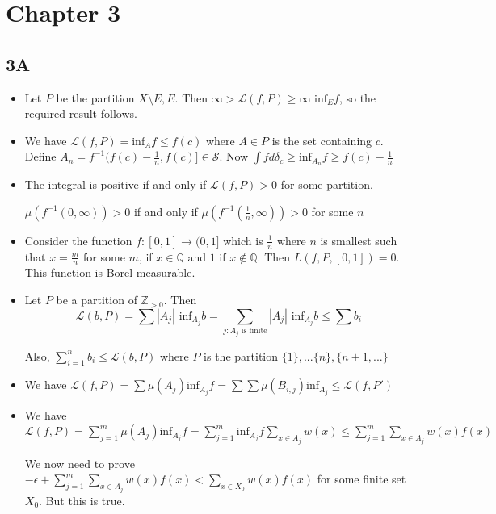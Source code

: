 \documentclass{article}
\begin{document}
\section*{Chapter 3}
\subsection*{3A}
\begin{itemize}
    \item [1] Let $P$ be the partition $X\setminus E,E$. Then $\infty>\mathcal{L}(f,P)\geq \infty \text{ inf}_Ef$, so the required result follows.
    \item[2] We have $\mathcal{L}(f,P)=\text{inf}_Af \leq f(c)$ where $A \in P$ is the set containing $c$. Define $A_n=f^{-1}(f(c)-\frac{1}{n},f(c)] \in \mathcal{S}$. Now $\int fd\delta_c\geq \text{inf}_{A_n}f\geq f(c)-\frac{1}{n}$

    \item[3] The integral is positive if and only if $\mathcal{L}(f,P)>0$ for some partition.

    $\mu(f^{-1}(0,\infty))>0$ if and only if $\mu(f^{-1}(\frac{1}{n},\infty))>0$ for some $n$

    \item[4] Consider the function $f:[0,1]\to(0,1]$ which is $\frac{1}{n}$ where $n$ is smallest such that $x=\frac{m}{n}$ for some $m$, if $x \in \mathbb{Q}$ 
            and $1$ if $x \notin \mathbb{Q}$. Then $L(f,P,[0,1])=0$. This function is Borel measurable.

    \item[5] Let $P$ be a partition of $\mathbb{Z}_{>0}$. Then \[\mathcal{L}(b,P)=\sum|A_j|\text{ inf}_{A_j}b= \sum_{j:A_j \text{ is finite}}|A_j|\text{ inf}_{A_j}b\leq \sum b_i\]

    Also, $\sum_{i=1}^nb_i\leq\mathcal{L}(b,P)$ where $P$ is the partition $\{1\},...\{n\},\{n+1,...\}$

    \item[6] We have $\mathcal{L}(f,P)=\sum\mu(A_j)\text{inf}_{A_j}f=\sum\sum\mu(B_{i,j})\text{inf}_{A_j}\leq\mathcal{L}(f,P')$

    \item[7] We have $\mathcal{L}(f,P)=\sum_{j=1}^m\mu(A_j) \text{inf}_{A_j}f=\sum_{j=1}^m \text{inf}_{A_j}f \sum_{x \in A_j}w(x)\leq \sum_{j=1}^m \sum_{x \in A_j} w(x)f(x)$

    We now need to prove $-\epsilon +\sum_{j=1}^m \sum_{x \in A_j} w(x)f(x)<\sum_{x \in X_0} w(x)f(x)$ for some finite set $X_0$. But this is true.


\end{itemize}
\end{document}
